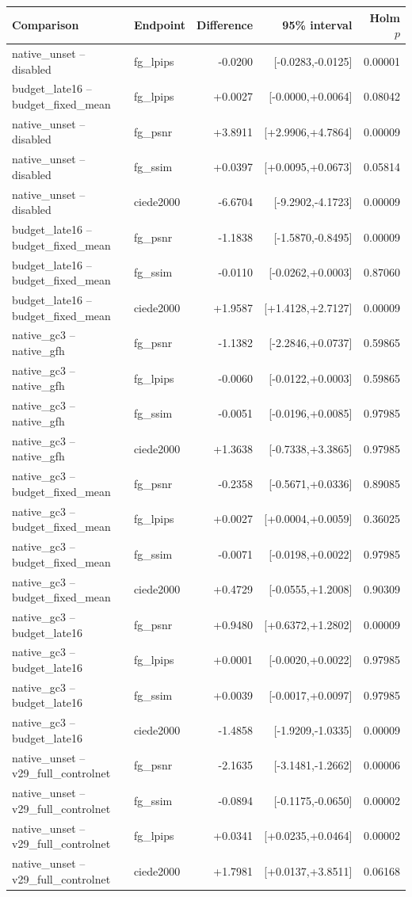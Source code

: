 \begin{tabular}{llrrr}
\toprule
Comparison & Endpoint & Difference & 95\% interval & Holm $p$ \\
\midrule
native\_unset -- disabled & fg\_lpips & -0.0200 & [-0.0283,-0.0125] & 0.00001 \\
budget\_late16 -- budget\_fixed\_mean & fg\_lpips & +0.0027 & [-0.0000,+0.0064] & 0.08042 \\
native\_unset -- disabled & fg\_psnr & +3.8911 & [+2.9906,+4.7864] & 0.00009 \\
native\_unset -- disabled & fg\_ssim & +0.0397 & [+0.0095,+0.0673] & 0.05814 \\
native\_unset -- disabled & ciede2000 & -6.6704 & [-9.2902,-4.1723] & 0.00009 \\
budget\_late16 -- budget\_fixed\_mean & fg\_psnr & -1.1838 & [-1.5870,-0.8495] & 0.00009 \\
budget\_late16 -- budget\_fixed\_mean & fg\_ssim & -0.0110 & [-0.0262,+0.0003] & 0.87060 \\
budget\_late16 -- budget\_fixed\_mean & ciede2000 & +1.9587 & [+1.4128,+2.7127] & 0.00009 \\
native\_gc3 -- native\_gfh & fg\_psnr & -1.1382 & [-2.2846,+0.0737] & 0.59865 \\
native\_gc3 -- native\_gfh & fg\_lpips & -0.0060 & [-0.0122,+0.0003] & 0.59865 \\
native\_gc3 -- native\_gfh & fg\_ssim & -0.0051 & [-0.0196,+0.0085] & 0.97985 \\
native\_gc3 -- native\_gfh & ciede2000 & +1.3638 & [-0.7338,+3.3865] & 0.97985 \\
native\_gc3 -- budget\_fixed\_mean & fg\_psnr & -0.2358 & [-0.5671,+0.0336] & 0.89085 \\
native\_gc3 -- budget\_fixed\_mean & fg\_lpips & +0.0027 & [+0.0004,+0.0059] & 0.36025 \\
native\_gc3 -- budget\_fixed\_mean & fg\_ssim & -0.0071 & [-0.0198,+0.0022] & 0.97985 \\
native\_gc3 -- budget\_fixed\_mean & ciede2000 & +0.4729 & [-0.0555,+1.2008] & 0.90309 \\
native\_gc3 -- budget\_late16 & fg\_psnr & +0.9480 & [+0.6372,+1.2802] & 0.00009 \\
native\_gc3 -- budget\_late16 & fg\_lpips & +0.0001 & [-0.0020,+0.0022] & 0.97985 \\
native\_gc3 -- budget\_late16 & fg\_ssim & +0.0039 & [-0.0017,+0.0097] & 0.97985 \\
native\_gc3 -- budget\_late16 & ciede2000 & -1.4858 & [-1.9209,-1.0335] & 0.00009 \\
native\_unset -- v29\_full\_controlnet & fg\_psnr & -2.1635 & [-3.1481,-1.2662] & 0.00006 \\
native\_unset -- v29\_full\_controlnet & fg\_ssim & -0.0894 & [-0.1175,-0.0650] & 0.00002 \\
native\_unset -- v29\_full\_controlnet & fg\_lpips & +0.0341 & [+0.0235,+0.0464] & 0.00002 \\
native\_unset -- v29\_full\_controlnet & ciede2000 & +1.7981 & [+0.0137,+3.8511] & 0.06168 \\
\bottomrule
\end{tabular}
